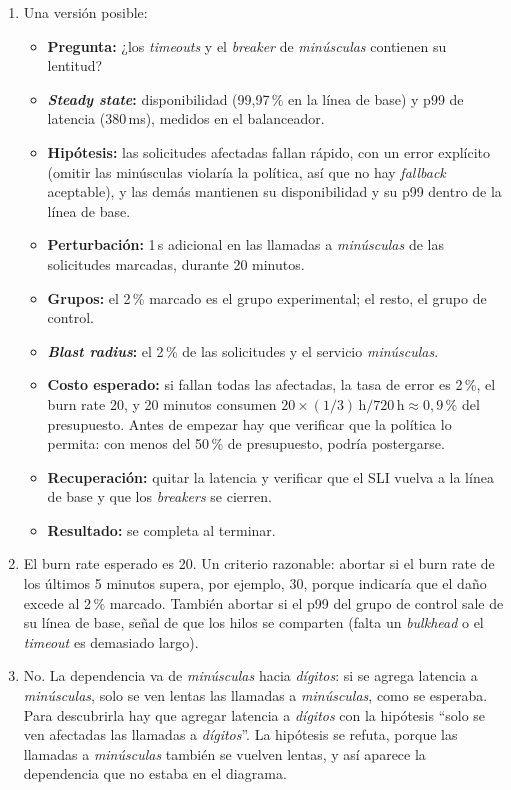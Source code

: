 \documentclass[variant=guia,cover=institutional,mode=screen]{ua-engineering-v6-article}
\begin{document}
\begin{uaanswer}
\begin{enumerate}
\item Una versión posible:
\begin{itemize}
\item \textbf{Pregunta:} ¿los \emph{timeouts} y el \emph{breaker} de \emph{minúsculas} contienen su lentitud?
\item \textbf{\emph{Steady state}:} disponibilidad (99,97\,\% en la línea de base) y p99 de latencia (380\,ms), medidos en el balanceador.
\item \textbf{Hipótesis:} las solicitudes afectadas fallan rápido, con un error explícito (omitir las minúsculas violaría la política, así que no hay \emph{fallback} aceptable), y las demás mantienen su disponibilidad y su p99 dentro de la línea de base.
\item \textbf{Perturbación:} 1\,s adicional en las llamadas a \emph{minúsculas} de las solicitudes marcadas, durante 20 minutos.
\item \textbf{Grupos:} el 2\,\% marcado es el grupo experimental; el resto, el grupo de control.
\item \textbf{\emph{Blast radius}:} el 2\,\% de las solicitudes y el servicio \emph{minúsculas}.
\item \textbf{Costo esperado:} si fallan todas las afectadas, la tasa de error es 2\,\%, el burn rate 20, y 20 minutos consumen $20 \times (1/3)\,\text{h} / 720\,\text{h} \approx 0{,}9\,\%$ del presupuesto. Antes de empezar hay que verificar que la política lo permita: con menos del 50\,\% de presupuesto, podría postergarse.
\item \textbf{Recuperación:} quitar la latencia y verificar que el SLI vuelva a la línea de base y que los \emph{breakers} se cierren.
\item \textbf{Resultado:} se completa al terminar.
\end{itemize}
\item El burn rate esperado es 20. Un criterio razonable: abortar si el burn rate de los últimos 5 minutos supera, por ejemplo, 30, porque indicaría que el daño excede al 2\,\% marcado. También abortar si el p99 del grupo de control sale de su línea de base, señal de que los hilos se comparten (falta un \emph{bulkhead} o el \emph{timeout} es demasiado largo).
\item No. La dependencia va de \emph{minúsculas} hacia \emph{dígitos}: si se agrega latencia a \emph{minúsculas}, solo se ven lentas las llamadas a \emph{minúsculas}, como se esperaba. Para descubrirla hay que agregar latencia a \emph{dígitos} con la hipótesis ``solo se ven afectadas las llamadas a \emph{dígitos}''. La hipótesis se refuta, porque las llamadas a \emph{minúsculas} también se vuelven lentas, y así aparece la dependencia que no estaba en el diagrama.
\end{enumerate}
\end{uaanswer}
\end{document}
